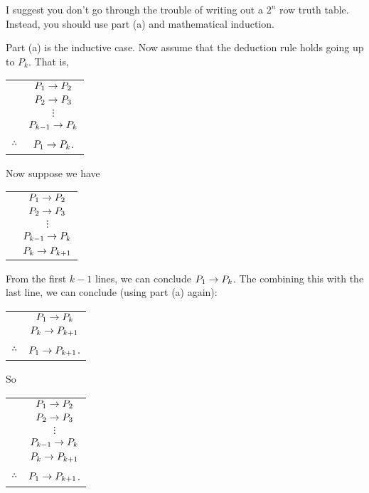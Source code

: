 \documentclass[11pt]{exam}
\begin{document}
\begin{questions}
\begin{parts}
I suggest you don't go through the trouble of writing out a $2^n$ row truth table.  Instead, you should use part (a) and mathematical induction.
\begin{solution}
Part (a) is the inductive case.  Now assume that the deduction rule holds going up to $P_k$.  That is, 

\begin{tabular}{rc}
  & $P_1 \rightarrow P_2$\\
  & $P_2 \rightarrow P_3$ \\ 
  & $\vdots$ \\
  & $P_{k-1} \rightarrow P_k$ \\ \hline
  $\therefore$ & $P_1 \rightarrow P_k$.
\end{tabular}

Now suppose we have

\begin{tabular}{rc}
  & $P_1 \rightarrow P_2$\\
  & $P_2 \rightarrow P_3$ \\ 
  & $\vdots$ \\
  & $P_{k-1} \rightarrow P_k$ \\ 
  & $P_k \rightarrow P_{k+1}$
\end{tabular}

From the first $k-1$ lines, we can conclude $P_1 \rightarrow P_k$.  The combining this with the last line, we can conclude (using part (a) again):

\begin{tabular}{rc}
  & $P_1 \rightarrow P_k$\\
  & $P_{k} \rightarrow P_{k+1}$ \\ \hline
  $\therefore$ & $P_1 \rightarrow P_{k+1}$.
\end{tabular}

So 

\begin{tabular}{rc}
  & $P_1 \rightarrow P_2$\\
  & $P_2 \rightarrow P_3$ \\ 
  & $\vdots$ \\
  & $P_{k-1} \rightarrow P_k$ \\ 
  & $P_k \rightarrow P_{k+1}$\\ \hline
  $\therefore$ & $P_1 \rightarrow P_{k+1}$.  
\end{tabular}
\end{solution}

\end{parts}








\end{questions}
\end{document}
